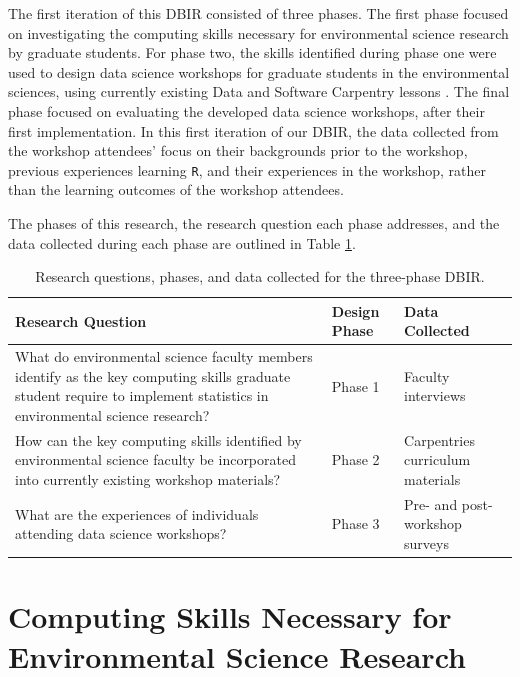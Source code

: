 \documentclass[12pt]{article}
\begin{document}
\quad The first iteration of this DBIR consisted of three phases. The first 
phase focused on investigating the computing skills necessary for environmental 
science research by graduate students. For phase two, the skills identified 
during phase one were used to design data science workshops for graduate 
students in the environmental sciences, using currently existing Data and 
Software Carpentry lessons \citep{carpentries}. The final phase focused on
evaluating the developed data science workshops, after their first
implementation. In this first iteration of our DBIR, the data collected from the
workshop attendees' focus on their backgrounds prior to the workshop, previous
experiences learning \texttt{R}, and their experiences in the workshop, rather
than the learning outcomes of the workshop attendees. 

\quad The phases of this research, the research question each phase addresses, 
and the data collected during each phase are outlined in Table \ref{tab:phases}. 

{
\begin{table}[h!]
\centering
\begin{tabular}{p{10cm}p{2cm}p{3cm}}
\hline
Research Question & Design Phase & Data Collected  \\
\hline
What do environmental science faculty members identify as the key computing skills graduate student require to implement statistics in environmental science research?   &  Phase 1 & Faculty interviews \\ \vspace{0.1cm}

How can the key computing skills identified by environmental science faculty be incorporated into currently existing workshop materials?  & Phase 2 & Carpentries curriculum materials  \\ \vspace{0.1cm}

What are the experiences of individuals attending data science workshops?  & Phase 3 & Pre- and post-workshop surveys \\
\hline
\end{tabular}
\caption{Research questions, phases, and data collected for the three-phase DBIR.}
\label{tab:phases}
\end{table}
}

\section{Computing Skills Necessary for Environmental Science Research}
\label{sec:design}
\end{document}
